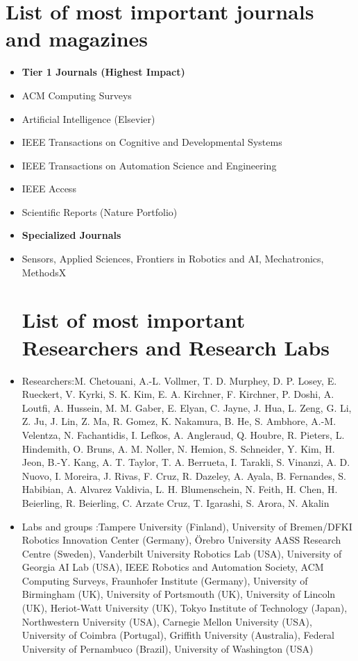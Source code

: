 \documentclass[report.tex]{subfiles}
\begin{document}
        \section{List of most important journals and magazines}
        \begin{itemize}
            \item \textbf{Tier 1 Journals (Highest Impact)}
            \item {ACM Computing Surveys}
            \item {Artificial Intelligence (Elsevier)}
            \item {IEEE Transactions on Cognitive and Developmental Systems}
    
            \item {IEEE Transactions on Automation Science and Engineering}
            \item {IEEE Access}
            \item {Scientific Reports (Nature Portfolio)}
            \item \textbf{Specialized Journals }
            \item {Sensors, Applied Sciences, Frontiers in Robotics and AI, Mechatronics, MethodsX}
            
            \section{List of most important Researchers and Research Labs}
            \item {Researchers:M. Chetouani, A.-L. Vollmer, T. D. Murphey, D. P. Losey, E. Rueckert, V. Kyrki, S. K. Kim, E. A. Kirchner, F. Kirchner, P. Doshi, A. Loutfi, A. Hussein, M. M. Gaber, E. Elyan, C. Jayne, J. Hua, L. Zeng, G. Li, Z. Ju, J. Lin, Z. Ma, R. Gomez, K. Nakamura, B. He, S. Ambhore, A.-M. Velentza, N. Fachantidis, I. Lefkos, A. Angleraud, Q. Houbre, R. Pieters, L. Hindemith, O. Bruns, A. M. Noller, N. Hemion, S. Schneider, Y. Kim, H. Jeon, B.-Y. Kang, A. T. Taylor, T. A. Berrueta, I. Tarakli, S. Vinanzi, A. D. Nuovo, I. Moreira, J. Rivas, F. Cruz, R. Dazeley, A. Ayala, B. Fernandes, S. Habibian, A. Alvarez Valdivia, L. H. Blumenschein, N. Feith, H. Chen, H. Beierling, R. Beierling, C. Arzate Cruz, T. Igarashi, S. Arora, N. Akalin }
    
            \item {Labs and  groups :Tampere University (Finland), University of Bremen/DFKI Robotics Innovation Center (Germany), Örebro University AASS Research Centre (Sweden), Vanderbilt University Robotics Lab (USA), University of Georgia AI Lab (USA), IEEE Robotics and Automation Society, ACM Computing Surveys, Fraunhofer Institute (Germany), University of Birmingham (UK), University of Portsmouth (UK), University of Lincoln (UK), Heriot-Watt University (UK), Tokyo Institute of Technology (Japan), Northwestern University (USA), Carnegie Mellon University (USA), University of Coimbra (Portugal), Griffith University (Australia), Federal University of Pernambuco (Brazil), University of Washington (USA) }
        \end{itemize}
\end{document}
